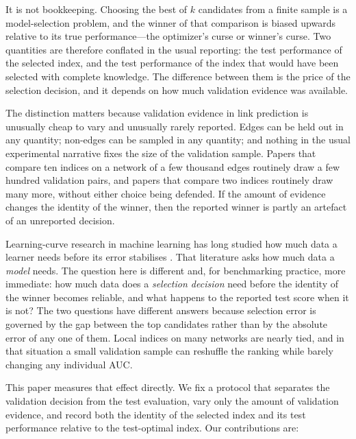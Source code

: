 \documentclass{comjnl}
\begin{document}
It is not bookkeeping. Choosing the best of $k$ candidates from a finite sample is a model-selection problem, and the winner of that comparison is biased upwards relative to its true performance---the optimizer's curse \citep{smith2006optimizer} or winner's curse. Two quantities are therefore conflated in the usual reporting: the test performance of the selected index, and the test performance of the index that would have been selected with complete knowledge. The difference between them is the price of the selection decision, and it depends on how much validation evidence was available.

The distinction matters because validation evidence in link prediction is unusually cheap to vary and unusually rarely reported. Edges can be held out in any quantity; non-edges can be sampled in any quantity; and nothing in the usual experimental narrative fixes the size of the validation sample. Papers that compare ten indices on a network of a few thousand edges routinely draw a few hundred validation pairs, and papers that compare two indices routinely draw many more, without either choice being defended. If the amount of evidence changes the identity of the winner, then the reported winner is partly an artefact of an unreported decision.

Learning-curve research in machine learning has long studied how much data a learner needs before its error stabilises \citep{provost1999efficient,perlich2003tree,mukherjee2003estimating,figueroa2012predicting}. That literature asks how much data a \emph{model} needs. The question here is different and, for benchmarking practice, more immediate: how much data does a \emph{selection decision} need before the identity of the winner becomes reliable, and what happens to the reported test score when it is not? The two questions have different answers because selection error is governed by the gap between the top candidates rather than by the absolute error of any one of them. Local indices on many networks are nearly tied, and in that situation a small validation sample can reshuffle the ranking while barely changing any individual AUC.

This paper measures that effect directly. We fix a protocol that separates the validation decision from the test evaluation, vary only the amount of validation evidence, and record both the identity of the selected index and its test performance relative to the test-optimal index. Our contributions are:
\end{document}
